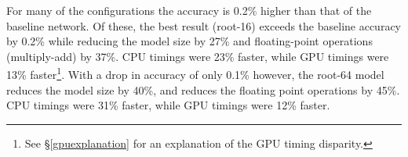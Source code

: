 \documentclass[thesis]{subfiles}
\begin{document}
	For many of the configurations the accuracy is 0.2\% higher than that of the baseline network. Of these, the best result (root-16) exceeds the baseline accuracy by 0.2\% while reducing the model size by 27\% and floating-point operations (multiply-add) by 37\%. CPU timings were 23\% faster, while GPU timings were 13\% faster\footnote{See \S\ref{gpuexplanation} for an explanation of the GPU timing disparity.}. With a drop in accuracy of only 0.1\% however, the root-64 model reduces the model size by 40\%, and reduces the floating point operations by 45\%. CPU timings were 31\% faster, while GPU timings were 12\% faster. 
	
\begin{figure}[tbp]
	\centering
	\begin{subfigure}[b]{0.95\columnwidth}
		\gdatatable
		\alldatatable
		\codatatable
		
		

\end{subfigure}
\end{figure}
\end{document}
